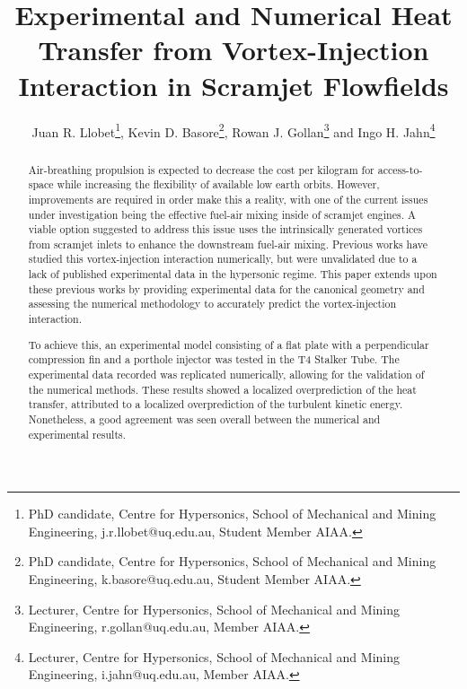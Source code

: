 \documentclass{AIAA}
\begin{document}
\title{Experimental and Numerical Heat Transfer from Vortex-Injection Interaction in Scramjet Flowfields}

\author{Juan R. Llobet\footnote{PhD candidate, Centre for Hypersonics, School of Mechanical and Mining Engineering, j.r.llobet@uq.edu.au, Student Member AIAA.}, Kevin D. Basore\footnote{PhD candidate, Centre for Hypersonics, School of Mechanical and Mining Engineering, k.basore@uq.edu.au, Student Member AIAA.}, Rowan J. Gollan\footnote{Lecturer, Centre for Hypersonics, School of Mechanical and Mining Engineering, r.gollan@uq.edu.au, Member AIAA.} and Ingo H. Jahn\footnote{Lecturer, Centre for Hypersonics, School of Mechanical and Mining Engineering, i.jahn@uq.edu.au, Member AIAA.}}

\begin{abstract}

Air-breathing propulsion is expected to decrease the cost per kilogram for access-to-space while increasing the flexibility of available low earth orbits.
However, improvements are required in order make this a reality, with one of the current issues under investigation being the effective fuel-air mixing inside of scramjet engines.
A viable option suggested to address this issue uses the intrinsically generated vortices from scramjet inlets to enhance the downstream fuel-air mixing.
Previous works have studied this vortex-injection interaction numerically, but were unvalidated due to a lack of published experimental data in the hypersonic regime.
This paper extends upon these previous works by providing experimental data for the canonical geometry and assessing the numerical methodology to accurately predict the vortex-injection interaction.
\vspace{11pt}

To achieve this, an experimental model consisting of a flat plate with a perpendicular compression fin and a porthole injector was tested in the T4 Stalker Tube.
The experimental data recorded was replicated numerically, allowing for the validation of the numerical methods.
These results showed a localized overprediction of the heat transfer, attributed to a localized overprediction of the turbulent kinetic energy.
Nonetheless, a good agreement was seen overall between the numerical and experimental results. 


\end{abstract}
\end{document}
